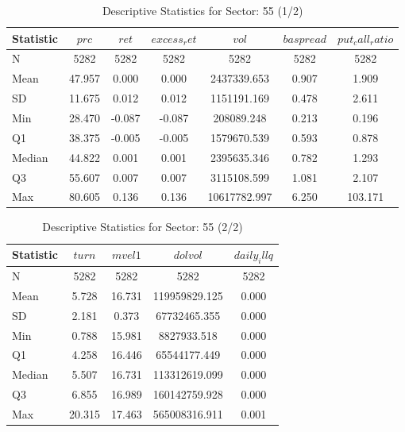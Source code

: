     \begin{table}[H]
    \centering

    
    \caption{Descriptive Statistics for Sector: 55 (1/2)}
    \label{tab:sec55_a}
    
    \begin{tabular}{lcccccc}
    \toprule
    Statistic & $prc$ & $ret$ & $excess_ret$ & $vol$ & $baspread$ & $put_call_ratio$ \\\midrule
    N & 5282 & 5282 & 5282 & 5282 & 5282 & 5282 \\
    Mean & 47.957 & 0.000 & 0.000 & 2437339.653 & 0.907 & 1.909 \\
    SD & 11.675 & 0.012 & 0.012 & 1151191.169 & 0.478 & 2.611 \\
    Min & 28.470 & -0.087 & -0.087 & 208089.248 & 0.213 & 0.196 \\
    Q1 & 38.375 & -0.005 & -0.005 & 1579670.539 & 0.593 & 0.878 \\
    Median & 44.822 & 0.001 & 0.001 & 2395635.346 & 0.782 & 1.293 \\
    Q3 & 55.607 & 0.007 & 0.007 & 3115108.599 & 1.081 & 2.107 \\
    Max & 80.605 & 0.136 & 0.136 & 10617782.997 & 6.250 & 103.171 \\
    \bottomrule
    \end{tabular}

    \end{table}
    
    \begin{table}[H]
    \centering

    
    \caption{Descriptive Statistics for Sector: 55 (2/2)}
    \label{tab:sec55_b}
    
    \begin{tabular}{lcccc}
    \toprule
    Statistic & $turn$ & $mvel1$ & $dolvol$ & $daily_illq$ \\\midrule
    N & 5282 & 5282 & 5282 & 5282 \\
    Mean & 5.728 & 16.731 & 119959829.125 & 0.000 \\
    SD & 2.181 & 0.373 & 67732465.355 & 0.000 \\
    Min & 0.788 & 15.981 & 8827933.518 & 0.000 \\
    Q1 & 4.258 & 16.446 & 65544177.449 & 0.000 \\
    Median & 5.507 & 16.731 & 113312619.099 & 0.000 \\
    Q3 & 6.855 & 16.989 & 160142759.928 & 0.000 \\
    Max & 20.315 & 17.463 & 565008316.911 & 0.001 \\
    \bottomrule
    \end{tabular}

    \end{table}
    
